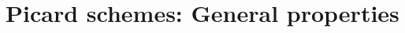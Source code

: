 \chapter{Picard schemes: General properties}\label{fga3.vi}
\setcounter{section}{-1}


\newpage


\newpage


\newpage


\newpage


\newpage




